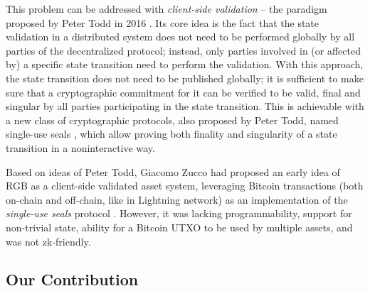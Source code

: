 \documentclass[9pt,oneside]{amsart}
\begin{document}
\begin{multicols}{2}
This problem can be addressed with \emph{client-side validation} –
the paradigm proposed by Peter Todd in 2016 \cite{CSV}.
Its core idea is the fact that the state validation in a distributed system
does not need to be performed globally by all parties of the decentralized protocol;
instead, only parties involved in (or affected by)
a specific state transition need to perform the validation.
With this approach, the state transition does not need to be published globally;
it is sufficient to make sure that a cryptographic commitment for it
can be verified to be valid, final and singular
by all parties participating in the state transition.
This is achievable with a new class of cryptographic protocols,
also proposed by Peter Todd, named single-use seals \cite{SUS1, SUS2, SUS3, SUS4},
which allow proving both finality and singularity\footnotemark
of a state transition in a noninteractive way.


Based on ideas of Peter Todd, Giacomo Zucco had proposed
an early idea of RGB as a client-side validated asset system,
leveraging Bitcoin transactions (both on-chain and off-chain, like in Lightning network)
as an implementation of the \emph{single-use seals} protocol \cite{Zucco}.
However, it was lacking programmability, support for non-trivial state,
ability for a Bitcoin UTXO to be used by multiple assets,
and was not zk-friendly.

\subsection{Our Contribution}


\end{multicols}
\end{document}
